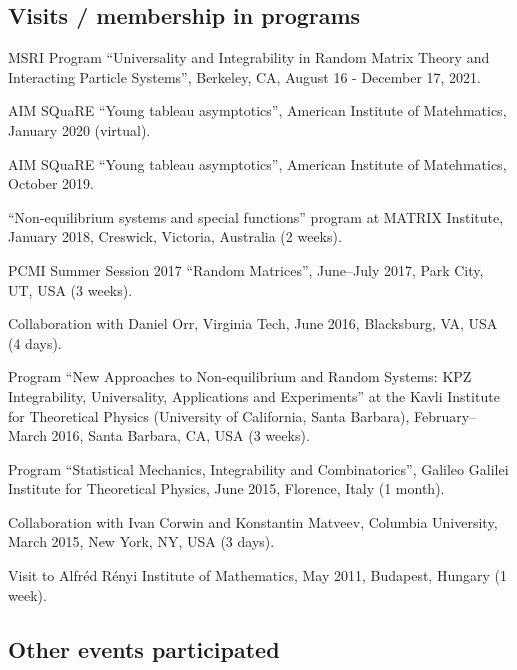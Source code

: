 \documentclass[letterpaper,11pt]{article}
\begin{document}
\subsection*{Visits / membership in programs}

\begin{etaremune}
	\item 
	MSRI Program ``Universality and Integrability in Random Matrix Theory and Interacting Particle Systems'', Berkeley, CA, August 16 - December 17, 2021.
	\item 
	AIM SQuaRE ``Young tableau asymptotics'', American Institute of Matehmatics, 
	January 2020 (virtual).
	\item 
	AIM SQuaRE ``Young tableau asymptotics'', American Institute of Matehmatics, 
	October 2019.
	\item 
		``Non-equilibrium systems and special functions'' program at MATRIX Institute,
		January 2018, 
		Creswick, Victoria, Australia (2 weeks).
	\item
	      PCMI Summer Session 2017 ``Random Matrices'', June--July 2017,
	      Park City, UT, USA (3 weeks).
	\item
	      Collaboration with Daniel Orr, Virginia Tech, June 2016,
	      Blacksburg, VA, USA (4 days).
	\item
	      Program ``New Approaches to Non-equilibrium and Random Systems:
	      KPZ Integrability, Universality, Applications and Experiments'' at the Kavli
	      Institute for Theoretical Physics (University of California, Santa Barbara),
	      February--March 2016, Santa Barbara, CA, USA (3 weeks).
	\item
	      Program ``Statistical Mechanics, Integrability and
	      Combinatorics'', Galileo Galilei Institute for Theoretical Physics, June 2015,
	      Florence, Italy (1 month).
	\item
	      Collaboration with Ivan Corwin and Konstantin Matveev, Columbia
	      University, March 2015, New York, NY, USA (3 days).
	\item
	      Visit to Alfr\'ed R\'enyi Institute of Mathematics, May 2011,
	      Budapest, Hungary (1 week).
\end{etaremune}

\subsection*{Other events participated}
\end{document}
